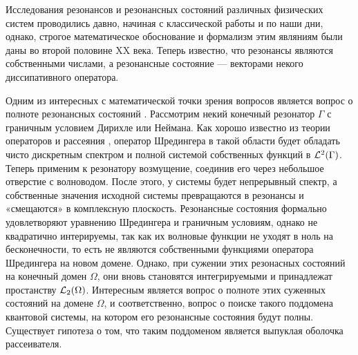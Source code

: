 \startprefacepage

Исследования резонансов и резонансных состояний различных физических систем проводились давно, начиная с классической работы  и по наши дни, однако, строгое математическое обоснование и формализм этим являниям были даны во второй половине XX века. Теперь известно, что резонансы являются собственными числами, а резонансные состояние — векторами некого диссипативного оператора. 


Одним из интересных с математической точки зрения вопросов является вопрос о полноте резонансных состояний . Рассмотрим некий конечный резонатор $\Gamma$ с граничным условием Дирихле или Неймана. Как хорошо известно из теории операторов и рассеяния , оператор Шредингера в такой области будет обладать чисто дискретным спектром и полной системой собственных функций в $\mathcal{L}^2(\Gamma)$. Теперь применим к резонатору возмущение, соединив его через небольшое отверстие с волноводом. После этого, у системы будет непрерывный спектр, а собственные значения исходной системы превращаются в резонансы и «смещаются» в комплексную плоскость. Резонансные состояния формально удовлетворяют уравнению Шредингера и граничным условиям, однако не квадратично интерируемы, так как их волновые функции не уходят в ноль на бесконечности, то есть не являются собственными функциями оператора Шредингера на новом домене. Однако, при сужении этих резонасных состояний на конечный домен $\Omega$, они вновь становятся интегрируемыми и принадлежат простанству $\mathcal{L}_2(\Omega)$. Интересным является вопрос о полноте этих суженных состояний на домене $\Omega$, и соответственно, вопрос о поиске такого поддомена квантовой системы, на котором его резонансные состояния будут полны. Существует гипотеза о том, что таким поддоменом является выпуклая оболочка рассеивателя. 


